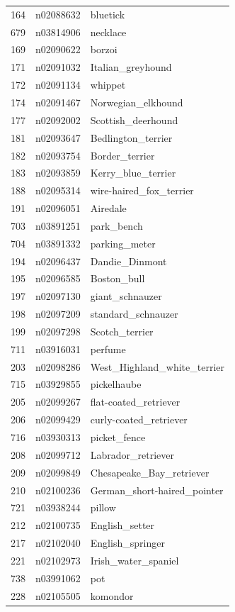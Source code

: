\begin{table}
\begin{tabular}{cll}
164 & n02088632 & bluetick \\
679 & n03814906 & necklace \\
169 & n02090622 & borzoi \\
171 & n02091032 & Italian_greyhound \\
172 & n02091134 & whippet \\
174 & n02091467 & Norwegian_elkhound \\
177 & n02092002 & Scottish_deerhound \\
181 & n02093647 & Bedlington_terrier \\
182 & n02093754 & Border_terrier \\
183 & n02093859 & Kerry_blue_terrier \\
188 & n02095314 & wire-haired_fox_terrier \\
191 & n02096051 & Airedale \\
703 & n03891251 & park_bench \\
704 & n03891332 & parking_meter \\
194 & n02096437 & Dandie_Dinmont \\
195 & n02096585 & Boston_bull \\
197 & n02097130 & giant_schnauzer \\
198 & n02097209 & standard_schnauzer \\
199 & n02097298 & Scotch_terrier \\
711 & n03916031 & perfume \\
203 & n02098286 & West_Highland_white_terrier \\
715 & n03929855 & pickelhaube \\
205 & n02099267 & flat-coated_retriever \\
206 & n02099429 & curly-coated_retriever \\
716 & n03930313 & picket_fence \\
208 & n02099712 & Labrador_retriever \\
209 & n02099849 & Chesapeake_Bay_retriever \\
210 & n02100236 & German_short-haired_pointer \\
721 & n03938244 & pillow \\
212 & n02100735 & English_setter \\
217 & n02102040 & English_springer \\
221 & n02102973 & Irish_water_spaniel \\
738 & n03991062 & pot \\
228 & n02105505 & komondor \\

\end{tabular}
\end{table}
